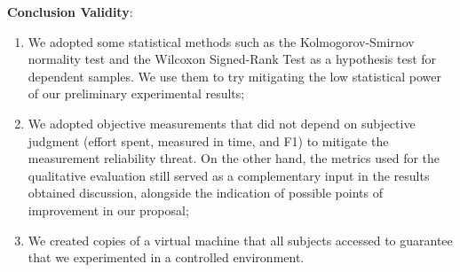 \textbf{Conclusion Validity}: 
\begin{enumerate} [label=\roman*.]
    \item We adopted some statistical methods such as the Kolmogorov-Smirnov normality test and the Wilcoxon Signed-Rank Test as a hypothesis test for dependent samples. We use them to try mitigating the low statistical power of our preliminary experimental results;
    \item We adopted objective measurements that did not depend on subjective judgment (effort spent, measured in time, and F1) to mitigate the measurement reliability threat.
    On the other hand, the metrics used for the qualitative evaluation still served as a complementary input in the results obtained discussion, alongside the indication of possible points of improvement in our proposal;
    \item We created copies of a virtual machine that all subjects accessed to guarantee that we experimented in a controlled environment.
\end{enumerate}


